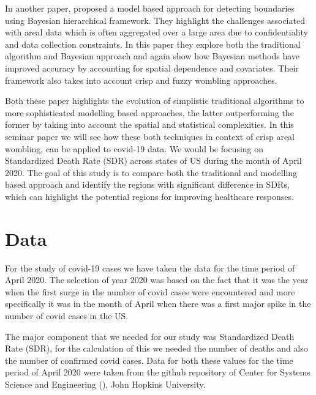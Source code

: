 \documentclass[enabledeprecatedfontcommands,parskip=half,twoside=semi,BCOR=0mm]{scrreprt}
\numberwithin{equation}{chapter}
\theoremstyle{definition}
\theoremstyle{remark}
\begin{document}
    In another paper, \cite{Lu_Carlin.2005} proposed a model based approach for detecting boundaries using Bayesian hierarchical framework. They highlight the challenges associated with areal data which is often aggregated over a large area due to confidentiality and data collection constraints. In this paper they explore both the traditional algorithm and Bayesian approach and again show how Bayesian methods have improved accuracy by accounting for spatial dependence and covariates. Their framework also takes into account crisp and fuzzy wombling approaches.
        
    Both these paper highlights the evolution of simplistic traditional algorithms to more sophisticated modelling based approaches, the latter outperforming the former by taking into account the spatial and statistical complexities. In this seminar paper we will see how these both techniques in context of crisp areal wombling, can be applied to covid-19 data. We would be focusing on Standardized Death Rate (SDR) across states of US during the month of April 2020. The goal of this study is to compare both the traditional and modelling based approach and identify the regions with significant difference in SDRs, which can highlight the potential regions for improving healthcare responses.

    \chapter{Data}
    For the study of covid-19 cases we have taken the data for the time period of April 2020. The selection of year 2020 was based on the fact that it was the year when the first surge in the number of covid cases were encountered and more specifically it was in the month of April when there was a first major spike in the number of covid cases in the US.  
    
    The major component that we needed for our study was Standardized Death Rate (SDR), for the calculation of this we needed the number of deaths and also the number of confirmed covid cases. Data for both these values for the time period of April 2020 were taken from the github repository of Center for Systems Science and Engineering (\cite{CSSE}), John Hopkins University. 
    
\end{document}
